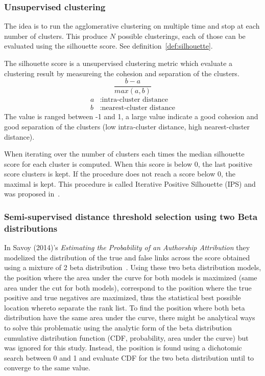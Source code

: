 \subsubsection{Unsupervised clustering}

The idea is to run the agglomerative clustering on multiple time and stop at each number of clusters.
This produce $N$ possible clusterings, each of those can be evaluated using the silhouette score.
See definition~\ref{def:silhouette}.

\begin{definition}
  \label{def:silhouette}
  The silhouette score is a unsupervised clustering metric which evaluate a clustering result by measureing the cohesion and separation of the clusters.
  \begin{equation}
    \frac{b - a}{max(a, b)}
  \end{equation}
  \begin{equation*}
    \begin{split}
      a&: \text{intra-cluster distance}\\
      b&: \text{nearest-cluster distance}
    \end{split}
  \end{equation*}
  The value is ranged between -1 and 1, a large value indicate a good cohesion and good separation of the clusters (low intra-cluster distance, high nearest-cluster distance).
\end{definition}

When iterating over the number of clusters each times the median silhouette score for each cluster is computed.
When this score is below 0, the last positive score clusters is kept.
If the procedure does not reach a score below 0, the maximal is kept.
This procedure is called Iterative Positive Silhouette (IPS) and was proposed in~\cite{automated_unsupervised}.

\subsubsection{Semi-supervised distance threshold selection using two Beta distributions}

In Savoy (2014)'s \textit{Estimating the Probability of an Authorship Attribution} they modelized the distribution of the true and false links across the score obtained using a mixture of 2 beta distribution~\cite{savoy_probability}.
Using these two beta distribution models, the position where the area under the curve for both models is maximized (same area under the cut for both models), correspond to the position where the true positive and true negatives are maximized, thus the statistical best possible location whereto separate the rank list.
To find the position where both beta distribution have the same area under the curve, there might be analytical ways to solve this problematic using the analytic form of the beta distribution cumulative distribution function (CDF, probability, area under the curve) but was ignored for this study.
Instead, the position is found using a dichotomic search between 0 and 1 and evaluate CDF for the two beta distribution until to converge to the same value.


